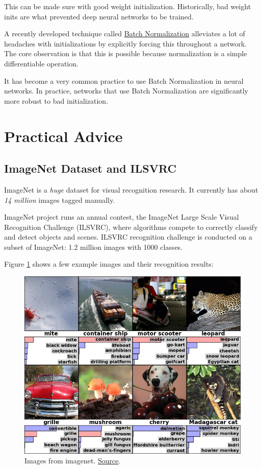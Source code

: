 \documentclass[a4paper]{tufte-handout}
\begin{document}
This can be made sure with good weight initialization. Historically, bad
weight inits are what prevented deep neural networks to be trained.

A recently developed technique called
\href{http://arxiv.org/abs/1502.03167}{Batch Normalization} alleviates a
lot of headaches with initializations by explicitly forcing this
throughout a network. The core observation is that this is possible
because normalization is a simple differentiable operation.

It has become a very common practice to use Batch Normalization in
neural networks. In practice, networks that use Batch Normalization are
significantly more robust to bad initialization.

\section{Practical Advice}\label{practical-advice}

\subsection{ImageNet Dataset and
ILSVRC}\label{imagenet-dataset-and-ilsvrc}

ImageNet is a \emph{huge} dataset for visual recognition research. It
currently has about \emph{14 million} images tagged manually.

ImageNet project runs an annual contest, the ImageNet Large
Scale Visual Recognition Challenge (ILSVRC), where algorithms compete
 to correctly classify and detect objects and scenes. ILSVRC
recognition challenge is conducted on a subset of ImageNet: 1.2 million
images with 1000 classes.

Figure \ref{fig:imagenet} shows a few example images and their recognition results:
\begin{figure}
\includegraphics[width=\linewidth]{imagenet.png}
\caption{Images from imagenet.
\href{http://mappingignorance.org/fx/media/2013/04/Deep-learning-5.png}{Source}.
} 
\label{fig:imagenet}
\end{figure}
\end{document}
